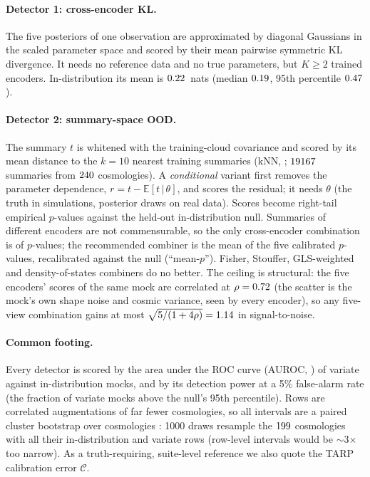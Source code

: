\documentclass[9pt,twocolumn]{extarticle}
\begin{document}
\paragraph{Detector 1: cross-encoder KL.} The five posteriors of one observation are
approximated by diagonal Gaussians in the scaled parameter space and scored by their mean pairwise
symmetric KL divergence. It needs no reference data and no true parameters, but $K\ge2$ trained
encoders. In-distribution its mean is $0.22$~nats (median $0.19$, 95th percentile
$0.47$).

\paragraph{Detector 2: summary-space OOD.} The summary $t$ is whitened with the training-cloud
covariance and scored by its mean distance to the $k=10$ nearest training summaries (kNN,
\cite{sun2022}; $19167$ summaries from $240$ cosmologies). A \emph{conditional} variant
first removes the parameter dependence, $r=t-\mathbb{E}[t\,|\,\theta]$, and scores the residual; it
needs $\theta$ (the truth in simulations, posterior draws on real data). Scores become right-tail
empirical $p$-values against the held-out in-distribution null. Summaries of different encoders are not
commensurable, so the only cross-encoder combination is of $p$-values; the recommended combiner is the
mean of the five calibrated $p$-values, recalibrated against the null (``mean-$p$''). Fisher, Stouffer,
GLS-weighted \cite{linsullivan2009} and density-of-states \cite{morningstar2021} combiners do no
better. The ceiling is structural: the five encoders' scores of the same mock are correlated at $\rho=0.72$
(the scatter is the mock's own shape noise and cosmic variance, seen by every encoder), so any
five-view combination gains at most $\sqrt{5/(1+4\rho)}=1.14$ in signal-to-noise.

\paragraph{Common footing.} Every detector is scored by the area under the ROC curve (AUROC,
\cite{bradley1997}) of variate against in-distribution mocks, and by its detection power at a 5\%
false-alarm rate (the fraction of variate mocks above the null's 95th percentile). Rows are correlated
augmentations of far fewer cosmologies, so all intervals are a paired cluster bootstrap over
cosmologies \cite{efron1993}: 1000 draws resample the $199$ cosmologies with all their
in-distribution and variate rows (row-level intervals would be $\sim$3$\times$ too narrow). As a
truth-requiring, suite-level reference we also quote the TARP \cite{lemos2023} calibration error
$\mathcal{C}$.
\end{document}
